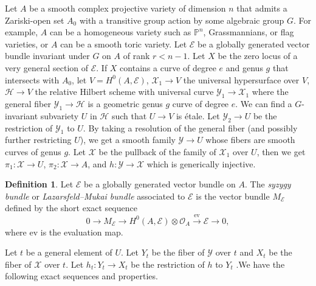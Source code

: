 \documentclass{amsart}
\theoremstyle{definition}
\newtheorem{definition}[theorem]{Definition}
\theoremstyle{remark}
\begin{document}
Let $A$ be a smooth complex projective variety of dimension $n$ that admits a Zariski-open set $A_0$ with a transitive group action by some algebraic group $G$. For example, $A$ can be a homogeneous variety such as $\mathbb{P}^n$, Grassmannians, or flag varieties, or $A$ can be a smooth toric variety. Let $\mathcal E$ be a globally generated vector bundle invariant under $G$ on $A$ of rank $r < n-1$. Let $X$ be the zero locus of a very general section of $\mathcal E$. If $X$ contains a curve of degree $e$ and genus $g$ that intersects with $A_0$,
let $V=H^0(A,\mathcal E)$,
$\mathcal X_1 \to V$ the universal hypersurface over $V$,
$\mathcal H \to V$ the relative Hilbert scheme with universal curve $\mathcal Y_1 \to \mathcal X_1$ where the general fiber $\mathcal Y_1\to \mathcal H$ is a geometric genus $g$ curve of degree $e$. 
We can find a $G$-invariant subvariety $U$ in $\mathcal H$ such that $U \to V$ is étale.
Let  $\mathcal Y_2\to U$ be the restriction of $\mathcal Y_1$ to $U$. By taking a resolution of the general fiber (and possibly further restricting $U$), we get a smooth family $\mathcal Y \to U$ whose fibers are smooth curves of genus $g$. Let $\mathcal X$ be the pullback of the family of $\mathcal X_1$ over $U$, then we get 
$\pi_1: \mathcal X \to U$, $\pi_2: \mathcal X \to A$, and $h: \mathcal Y \to \mathcal X$ which is generically injective.
\begin{definition}
Let $\mathcal{E}$ be a globally generated vector bundle on $A$. 
The \emph{syzygy bundle} or \emph{Lazarsfeld--Mukai bundle} associated to $\mathcal{E}$ is the vector bundle $M_{\mathcal{E}}$ defined by the short exact sequence
\[
0 \longrightarrow M_{\mathcal{E}} \longrightarrow H^0(A, \mathcal{E}) \otimes \mathcal{O}_A 
\stackrel{\mathrm{ev}}{\longrightarrow} \mathcal{E} \longrightarrow 0,
\]
where $\mathrm{ev}$ is the evaluation map.
\end{definition}
Let $t$ be a general element of $U$. Let $Y_t$ be the fiber of $\mathcal Y$ over $t$ and $X_t$ be the fiber of $\mathcal X$
over $t$. Let $h_t
: Y_t \to X_t$ be the restriction of $h$ to $Y_t$
.We have the following exact sequences and properties.

\vspace{1em}

\end{document}
